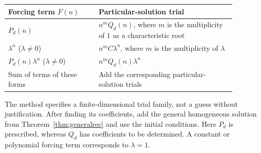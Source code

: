 \documentclass[11pt, oneside]{article}
\begin{document}
\begin{center}
\small
\renewcommand{\arraystretch}{1.22}
\begin{tabular}{@{}p{0.35\linewidth}p{0.53\linewidth}@{}}
\toprule
Forcing term $F(n)$ & Particular-solution trial \\
\midrule
$P_d(n)$ & $n^mQ_d(n)$, where $m$ is the multiplicity of $1$ as a characteristic root \\
$\lambda^n$ ($\lambda\ne0$) & $n^mC\lambda^n$, where $m$ is the multiplicity of $\lambda$ \\
$P_d(n)\lambda^n$ ($\lambda\ne0$) & $n^mQ_d(n)\lambda^n$ \\
Sum of terms of these forms & Add the corresponding particular-solution trials \\
\bottomrule
\end{tabular}
\end{center}
\begin{remark}
The method specifies a finite-dimensional trial family, not a guess without justification. After finding its coefficients, add the general homogeneous solution from Theorem~\ref{thm:generalrec} and use the initial conditions. Here $P_d$ is prescribed, whereas $Q_d$ has coefficients to be determined. A constant or polynomial forcing term corresponds to $\lambda=1$.
\end{remark}
\end{document}
